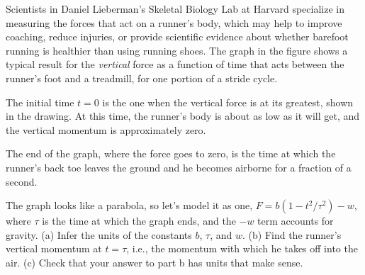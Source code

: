Scientists in Daniel Lieberman's Skeletal Biology Lab at Harvard
specialize in measuring the forces that act on a runner's body,
which may help to improve coaching, reduce injuries, or provide
scientific evidence about whether barefoot running is healthier
than using running shoes.
The graph in the figure shows a typical
result for the \emph{vertical} force as a function of time that acts between
the runner's foot and a treadmill, for one portion of a stride
cycle. 

The initial time $t=0$ is the one when the vertical force is at
its greatest, shown in the drawing. At this time, the runner's body is
about as low as it will get, and the vertical momentum is approximately zero.

The end of the graph, where the
force goes to zero, is the time at which the runner's back toe leaves
the ground and he becomes airborne for a fraction of a second.

The
graph looks like a parabola, so let's model it as one, $F=b(1-t^2/\tau^2)-w$,
where $\tau$ is the time at which the graph ends, and the $-w$ term accounts
for gravity. (a) Infer the units of the constants $b$, $\tau$, and $w$.
(b) Find the runner's vertical momentum at $t=\tau$, i.e., the momentum with which
he takes off into the air.
(c) Check that your answer to part b has units that make sense.\answercheck
